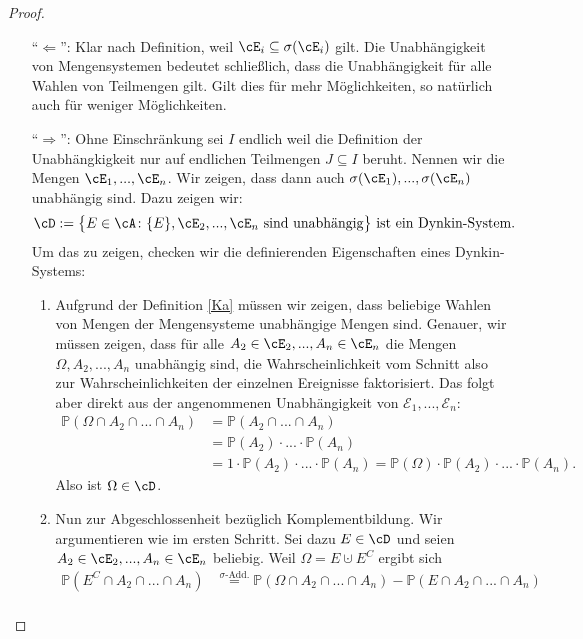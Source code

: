 \begin{proof}\abs
	\begin{itemize}
		\item[\enquote{$\Leftarrow$}:] Klar nach Definition, weil $\cE_i \subseteq \sigma(\cE_i)$ gilt. Die Unabh\"angigkeit von Mengensystemen bedeutet schlie\ss lich, dass die Unabh\"angigkeit f\"ur alle Wahlen von Teilmengen gilt. Gilt dies f\"ur mehr M\"oglichkeiten, so nat\"urlich auch f\"ur weniger M\"oglichkeiten.
		\item[\enquote{$\Rightarrow$}:] Ohne Einschr\"ankung sei $I$ endlich weil die Definition der Unabh\"angkigkeit nur auf endlichen Teilmengen $J \subseteq I$ beruht. Nennen wir die Mengen $\cE_1,...,\cE_n$. Wir zeigen, dass dann auch $\sigma(\cE_1),...,\sigma(\cE_n)$ unabhängig sind. Dazu zeigen wir:
		$$\cD:= \big\{ E \in \cA \colon \{ E \}, \cE_2, ..., \cE_n \text{ sind unabhängig} \big\}\text{ ist ein Dynkin-System.}$$
		Um das zu zeigen, checken wir die definierenden Eigenschaften eines Dynkin-Systems:
		\begin{enumerate}[label=(\roman*)]
			\item Aufgrund der Definition \ref{Ka} m\"ussen wir zeigen, dass beliebige Wahlen von Mengen der Mengensysteme unabh\"angige Mengen sind. Genauer, wir m\"ussen zeigen, dass f\"ur alle $ A_2 \in \cE_2,...,A_n \in \cE_n$ die Mengen $\Omega, A_2,...,A_n$ unabhängig sind, die Wahrscheinlichkeit vom Schnitt also zur Wahrscheinlichkeiten der einzelnen Ereignisse faktorisiert. Das folgt aber direkt aus der angenommenen Unabh\"angigkeit von $\mathcal E_1, ..., \mathcal E_n$:			
			\begin{align*}
				\mathbb{P}(\Omega \cap A_2 \cap ... \cap A_n) &= \mathbb{P}(A_2 \cap ... \cap A_n)\\
				 &= \mathbb{P}(A_2) \cdot ... \cdot \mathbb{P}(A_n)\\
				 & = 1 \cdot \mathbb{P}(A_2) \cdot ... \cdot \mathbb{P}(A_n)
				  = \mathbb{P}(\Omega) \cdot \mathbb{P}(A_2) \cdot ... \cdot \mathbb{P}(A_n).
			\end{align*}
			Also ist $\Omega \in \cD$.
			\item Nun zur Abgeschlossenheit bez\"uglich Komplementbildung. Wir argumentieren wie im ersten Schritt. Sei dazu $E \in \cD$ und seien $A_2 \in \cE_2,...,A_n \in \cE_n$ beliebig. Weil $\Omega=E\cupdot E^C$ ergibt sich
			\begin{align*}
				\mathbb{P}(E^C \cap A_2 \cap ... \cap A_n)& \overset{\sigma\text{-Add.}}{=} \mathbb{P}(\Omega \cap A_2 \cap ... \cap A_n) - \mathbb{P}(E \cap A_2 \cap ... \cap A_n) \\

\end{align*}
\end{enumerate}
\end{itemize}
\end{proof}
